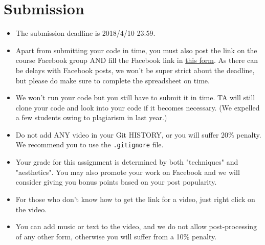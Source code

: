 \documentclass[12pt,a4paper]{article}
\begin{document}
\section{Submission}
\begin{itemize}
\item The submission deadline is 2018/4/10 23:59.
\item Apart from submitting your code in time,
you must also post the link on the course Facebook group
{\color{red}AND} fill the Facebook link in
\href{https://goo.gl/forms/iDL8aVlFyKXIRr2k1}{this form}.
As there can be delays with Facebook posts, we won't be super strict about the deadline, but please do make sure to complete the spreadsheet on time.
\item We won't run your code but you still have to submit it in time. TA will still clone your code and look into your code if it becomes necessary. (We expelled a few students owing to plagiarism in last year.)
\item Do not add ANY video in your Git HISTORY, or you will suffer 20\% penalty. We recommend you to use the \verb+.gitignore+ file.
\item Your grade for this assignment is determined by both "techniques" and "aesthetics". You may also promote your work on Facebook and we will consider giving you bonus points based on your post popularity.
\item For those who don't know how to get the link for a video, just right click on the video.
\item You can add music or text to the video, and we do not allow post-processing of any other form, otherwise you will suffer from a 10\% penalty.
\end{itemize}
\end{document}
